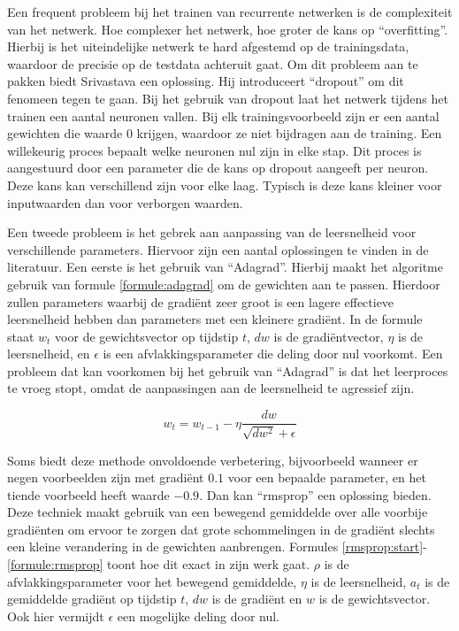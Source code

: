 Een frequent probleem bij het trainen van recurrente netwerken is de complexiteit van het netwerk. Hoe complexer het netwerk, hoe groter de kans op ``overfitting''. Hierbij is het uiteindelijke netwerk te hard afgestemd op de trainingsdata, waardoor de precisie op de testdata achteruit gaat. Om dit probleem aan te pakken biedt Srivastava\cite{Srivastava2013} een oplossing. Hij introduceert ``dropout'' om dit fenomeen tegen te gaan. Bij het gebruik van dropout laat het netwerk tijdens het trainen een aantal neuronen vallen. Bij elk trainingsvoorbeeld zijn er een aantal gewichten die waarde 0 krijgen, waardoor ze niet bijdragen aan de training. Een willekeurig proces bepaalt welke neuronen nul zijn in elke stap. Dit proces is aangestuurd door een parameter die de kans op dropout aangeeft per neuron. Deze  kans kan verschillend zijn voor elke laag. Typisch is deze kans kleiner voor inputwaarden dan voor verborgen waarden.

Een tweede probleem is het gebrek aan aanpassing van de leersnelheid voor verschillende parameters. Hiervoor zijn een aantal oplossingen te vinden in de literatuur. Een eerste is het gebruik van ``Adagrad''\cite{Duchi2011}. Hierbij maakt het algoritme gebruik van formule \eqref{formule:adagrad} om de gewichten aan te passen. Hierdoor zullen parameters waarbij de gradi\"ent zeer groot is een lagere effectieve leersnelheid hebben dan parameters met een kleinere gradi\"ent. In de formule staat $w_t$ voor de gewichtsvector op tijdstip $t$, $dw$ is de gradi\"entvector, $\eta$ is de leersnelheid, en $\epsilon$ is een afvlakkingsparameter die deling door nul voorkomt. Een probleem dat kan voorkomen bij het gebruik van ``Adagrad'' is dat het leerproces te vroeg stopt, omdat de aanpassingen aan de leersnelheid te agressief zijn.
 
\begin{equation}
    w_t = w_{t-1} - \eta \frac{dw}{\sqrt{dw^2} + \epsilon}
    \label{formule:adagrad}
\end{equation}

Soms biedt deze methode onvoldoende verbetering, bijvoorbeeld wanneer er negen voorbeelden zijn met gradi\"ent $0.1$ voor een bepaalde parameter, en het tiende voorbeeld heeft waarde $-0.9$. Dan kan ``rmsprop''\cite{RMSprop} een oplossing bieden. Deze techniek maakt gebruik van een bewegend gemiddelde over alle voorbije gradi\"enten om ervoor te zorgen dat grote schommelingen in de gradi\"ent slechts een kleine verandering in de gewichten aanbrengen. Formules \eqref{rmsprop:start}-\eqref{formule:rmsprop} toont hoe dit exact in zijn werk gaat. $\rho$ is de afvlakkingsparameter voor het bewegend gemiddelde, $\eta$ is de leersnelheid, $a_t$ is de gemiddelde gradi\"ent op tijdstip $t$, $dw$ is de gradi\"ent en $w$ is de gewichtsvector. Ook hier vermijdt $\epsilon$ een mogelijke deling door nul.

